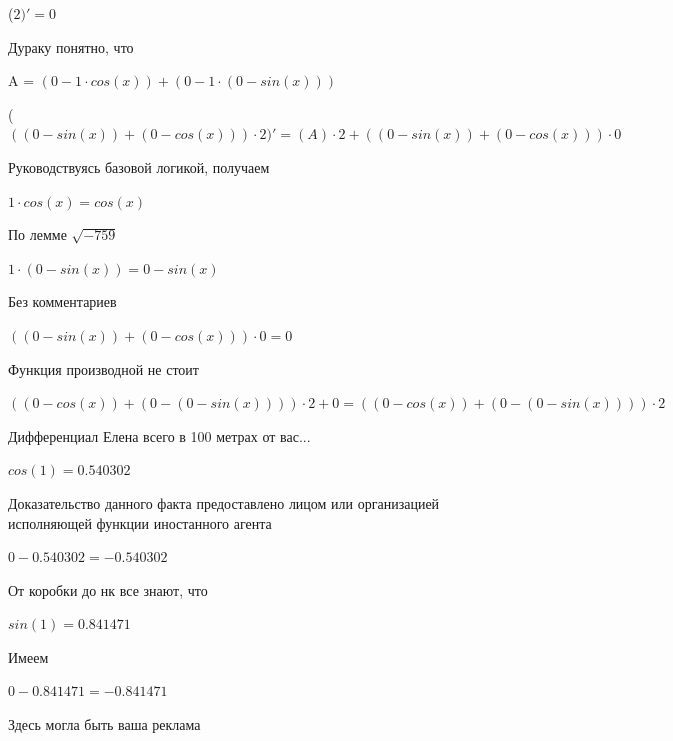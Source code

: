 \documentclass[12pt,a4paper,fleqn]{article}
\begin{document}
\begin{center}
 ($2)'
  = 0$\end{center}
Дураку понятно, что

\begin{center}
A = $(0-1 \cdot cos(x))+(0-1 \cdot (0-sin(x)))$\end{center}
\begin{center}
 ($((0-sin(x))+(0-cos(x))) \cdot 2)'
  = (A) \cdot 2+((0-sin(x))+(0-cos(x))) \cdot 0$\end{center}
Руководствуясь базовой логикой, получаем

\begin{center}
$1 \cdot cos(x) = cos(x)$\end{center}
По лемме $\sqrt{-759}$
\begin{center}
$1 \cdot (0-sin(x)) = 0-sin(x)$\end{center}
Без комментариев\cite{link4}

\begin{center}
$((0-sin(x))+(0-cos(x))) \cdot 0 = 0$\end{center}
Функция производной не стоит\cite{link2}

\begin{center}
$((0-cos(x))+(0-(0-sin(x)))) \cdot 2+0 = ((0-cos(x))+(0-(0-sin(x)))) \cdot 2$\end{center}
Дифференциал Елена всего в 100 метрах от вас...

\begin{center}
\end{center}
\begin{center}$cos(1) = 0.540302$\end{center}
Доказательство данного факта предоставлено лицом или организацией исполняющей функции иностанного агента

\begin{center}
\end{center}
\begin{center}$0-0.540302 = -0.540302$\end{center}
От коробки до нк все знают, что

\begin{center}
\end{center}
\begin{center}$sin(1) = 0.841471$\end{center}
Имеем

\begin{center}
\end{center}
\begin{center}$0-0.841471 = -0.841471$\end{center}
Здесь могла быть ваша реклама
\end{document}
